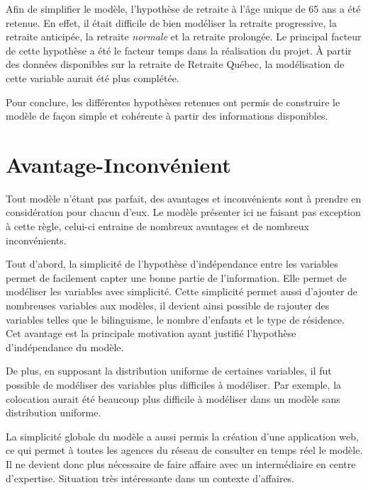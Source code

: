 \documentclass[11pt,french]{article}\usepackage[]{graphicx}\usepackage[]{color}
\begin{document}
Afin de simplifier le modèle, l'hypothèse de retraite à l'âge unique de 65 ans a été retenue. En effet, il était difficile de bien modéliser la retraite progressive, la retraite anticipée, la retraite \emph{normale} et la retraite prolongée. Le principal facteur de cette hypothèse a été le facteur temps dans la réalisation du projet. À partir des données disponibles sur la retraite de Retraite Québec, la modélisation de cette variable aurait été plus complétée.
\newline

Pour conclure, les différentes hypothèses retenues ont permis de construire le modèle de façon simple et cohérente à partir des informations disponibles.

\section{Avantage-Inconvénient}

Tout modèle n'étant pas parfait, des avantages et inconvénients sont à prendre en considération pour chacun d'eux. Le modèle présenter ici ne faisant pas exception à cette règle, celui-ci entraine de nombreux avantages et de nombreux inconvénients. 
\newline

Tout d'abord, la simplicité de l'hypothèse d'indépendance entre les variables permet de facilement capter une bonne partie de l'information. Elle permet de modéliser les variables avec simplicité. Cette simplicité permet aussi d'ajouter de nombreuses variables aux modèles, il devient ainsi possible de rajouter des variables telles que le bilinguisme, le nombre d'enfants et le type de résidence. Cet avantage est la principale motivation ayant justifié l'hypothèse d'indépendance du modèle.
\newline

De plus, en supposant la distribution uniforme de certaines variables, il fut possible de modéliser des variables plus difficiles à modéliser. Par exemple, la colocation aurait été beaucoup plus difficile à modéliser dans un modèle sans distribution uniforme. 
\newline

La simplicité globale du modèle a aussi permis la création d'une application web, ce qui permet à toutes les agences du réseau de consulter en temps réel le modèle. Il ne devient donc plus nécessaire de faire affaire avec un intermédiaire en centre d'expertise. Situation très intéressante dans un contexte d'affaires.
\newline
\end{document}
